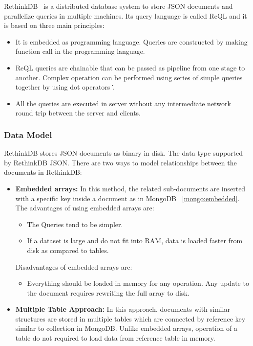 RethinkDB~\citep{rethinkdb} is a distributed database system to store  JSON documents and parallelize queries in multiple machines. Its query language is called ReQL and it is based on three main principles:
 \begin{itemize}
 \item  It is  embedded  as programming language. Queries are constructed by making function call in the programming language. 
 \item ReQL queries are chainable that can be passed as pipeline from one stage to another. Complex operation can be performed using series of simple queries together by using dot operators \. . 
 \item All the queries are executed in server without any intermediate network round trip between the server and clients.
 \end{itemize}
  
\subsubsection{Data Model}
RethinkDB stores JSON documents as binary in disk. The data type supported by RethinkDB JSON. 
There are two ways to model relationships between the documents in RethinkDB: 
\begin{itemize}
	\item \textbf{Embedded arrays:} In this method, the related sub-documents are inserted with a specific key inside a document as in MongoDB ~\ref{mongo:embedded}. The advantages of using embedded arrays are:
		\begin{itemize}
			\item The Queries tend to be simpler. 
			\item If a dataset is large and do not fit into RAM, data is loaded faster from disk as compared to tables. 
		\end{itemize}
		Disadvantages of embedded arrays are: 
		\begin{itemize}
			\item Everything should be loaded in memory for any operation. Any update to the document requires rewriting the full array to disk.
		\end{itemize}
		
	\item 
	\textbf{Multiple Table Approach:} In this approach, documents with similar structures are stored in multiple tables which are connected by reference key similar to collection in MongoDB. Unlike embedded arrays, operation of a table do not required to load data from reference table in memory.
\end{itemize}
